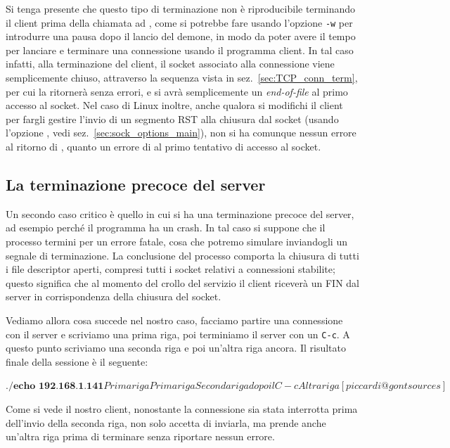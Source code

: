 Si tenga presente che questo tipo di terminazione non è riproducibile
terminando il client prima della chiamata ad , come si potrebbe
fare usando l'opzione \texttt{-w} per introdurre una pausa dopo il lancio del
demone, in modo da poter avere il tempo per lanciare e terminare una
connessione usando il programma client. In tal caso infatti, alla terminazione
del client, il socket associato alla connessione viene semplicemente chiuso,
attraverso la sequenza vista in sez.~\ref{sec:TCP_conn_term}, per cui la
 ritornerà senza errori, e si avrà semplicemente un
\textit{end-of-file} al primo accesso al socket. Nel caso di Linux inoltre,
anche qualora si modifichi il client per fargli gestire l'invio di un segmento
RST alla chiusura dal socket (usando l'opzione , vedi
sez.~\ref{sec:sock_options_main}), non si ha comunque nessun errore al ritorno
di , quanto un errore di  al primo tentativo
di accesso al socket.



\subsection{La terminazione precoce del server}
\label{sec:TCP_server_crash}

Un secondo caso critico è quello in cui si ha una terminazione precoce del
server, ad esempio perché il programma ha un crash. In tal caso si suppone che
il processo termini per un errore fatale, cosa che potremo simulare
inviandogli un segnale di terminazione. La conclusione del processo comporta
la chiusura di tutti i file descriptor aperti, compresi tutti i socket
relativi a connessioni stabilite; questo significa che al momento del crollo
del servizio il client riceverà un FIN dal server in corrispondenza della
chiusura del socket.

Vediamo allora cosa succede nel nostro caso, facciamo partire una connessione
con il server e scriviamo una prima riga, poi terminiamo il server con un
\texttt{C-c}. A questo punto scriviamo una seconda riga e poi un'altra riga
ancora. Il risultato finale della sessione è il seguente:
\begin{Console}
$ \textbf{./echo 192.168.1.141}
Prima riga
Prima riga
Seconda riga dopo il C-c
Altra riga
[piccardi@gont sources]$
\end{Console}

Come si vede il nostro client, nonostante la connessione sia stata interrotta
prima dell'invio della seconda riga, non solo accetta di inviarla, ma prende
anche un'altra riga prima di terminare senza riportare nessun
errore. 

